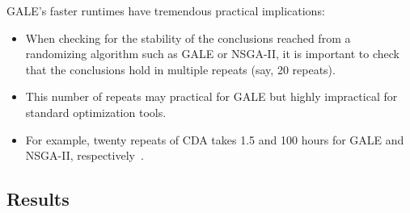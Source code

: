 \documentclass{sig-alternative}
\newcommand{\bi}{\begin{itemize}[leftmargin=0.4cm]}
\newcommand{\ei}{\end{itemize}}
\newcommand{\tab}[1]{Table ~\ref{tab:#1}}
\begin{document}
GALE's faster runtimes have  tremendous practical implications:
\bi
\item When checking for the stability of the conclusions reached from a randomizing
algorithm  such as GALE or NSGA-II, it is important to check that the conclusions hold in multiple repeats (say, 20 repeats). 
\item This number of repeats may practical for GALE but  highly impractical for standard optimization tools.
\item For example, twenty repeats of CDA takes 1.5 and 100 hours for GALE and NSGA-II, respectively~\cite{krallphd}.
\ei
\subsection{Results}




 

 
  




\end{document}
